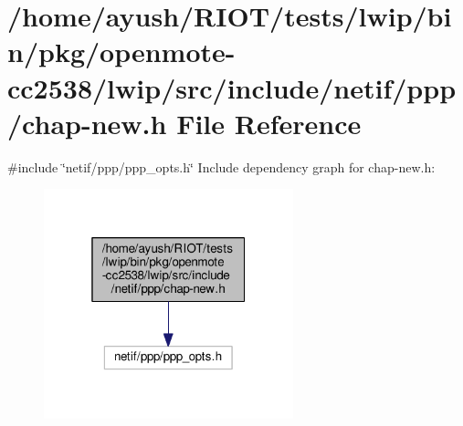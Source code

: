 \hypertarget{openmote-cc2538_2lwip_2src_2include_2netif_2ppp_2chap-new_8h}{}\section{/home/ayush/\+R\+I\+O\+T/tests/lwip/bin/pkg/openmote-\/cc2538/lwip/src/include/netif/ppp/chap-\/new.h File Reference}
\label{openmote-cc2538_2lwip_2src_2include_2netif_2ppp_2chap-new_8h}
{\ttfamily \#include \char`\"{}netif/ppp/ppp\+\_\+opts.\+h\char`\"{}}\newline
Include dependency graph for chap-\/new.h\+:
\nopagebreak
\begin{figure}[H]
\begin{center}
\leavevmode
\includegraphics[width=205pt]{openmote-cc2538_2lwip_2src_2include_2netif_2ppp_2chap-new_8h__incl}
\end{center}
\end{figure}
